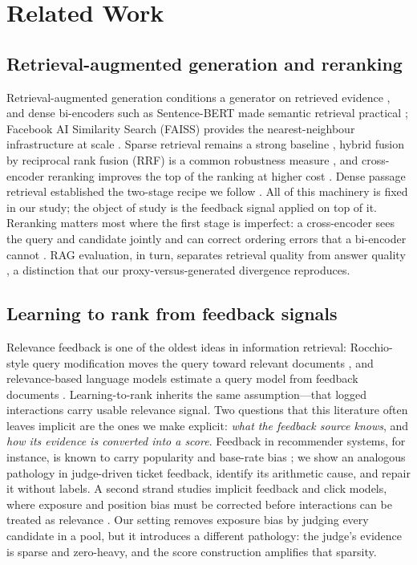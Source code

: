 \section{Related Work}
\label{sec:related}

\subsection{Retrieval-augmented generation and reranking}
Retrieval-augmented generation conditions a generator on retrieved evidence
\cite{b1}, and dense bi-encoders such as Sentence-BERT made semantic retrieval
practical \cite{b2,b28}; Facebook AI Similarity Search (FAISS) provides the
nearest-neighbour infrastructure at scale \cite{b3}. Sparse retrieval remains a
strong baseline \cite{b4}, hybrid fusion by reciprocal rank fusion (RRF) is a
common robustness measure \cite{b5}, and cross-encoder reranking improves the top
of the ranking at higher cost \cite{b6}. Dense passage retrieval established the
two-stage recipe we follow \cite{b7}. All of this machinery is fixed in our study;
the object of study is the feedback signal applied on top of it. Reranking matters
most where the first stage is imperfect: a cross-encoder sees the query and
candidate jointly and can correct ordering errors that a bi-encoder cannot
\cite{b6}. RAG evaluation, in turn, separates retrieval quality from answer
quality \cite{b1,b40,b41}, a distinction that our proxy-versus-generated
divergence reproduces.

\subsection{Learning to rank from feedback signals}
Relevance feedback is one of the oldest ideas in information retrieval:
Rocchio-style query modification moves the query toward relevant documents
\cite{b8}, and relevance-based language models estimate a query model from feedback
documents \cite{b9}. Learning-to-rank inherits the same assumption---that logged
interactions carry usable relevance signal. Two questions that this literature
often leaves implicit are the ones we make explicit: \emph{what the feedback source
knows}, and \emph{how its evidence is converted into a score}. Feedback in
recommender systems, for instance, is known to carry popularity and base-rate bias
\cite{b10}; we show an analogous pathology in judge-driven ticket feedback,
identify its arithmetic cause, and repair it without labels. A second strand studies
implicit feedback and click models, where exposure and position bias must be
corrected before interactions can be treated as relevance \cite{b34,b37}. Our
setting removes exposure bias by judging every candidate in a pool, but it
introduces a different pathology: the judge's evidence is sparse and zero-heavy,
and the score construction amplifies that sparsity.

